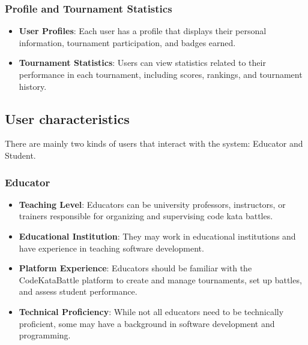 \subsubsection{Profile and Tournament Statistics}
\begin{itemize}
    \item \textbf{User Profiles}: Each user has a profile that displays their personal information, tournament participation, and badges earned.
    \item \textbf{Tournament Statistics}: Users can view statistics related to their performance in each tournament, including scores, rankings, and tournament history.
\end{itemize}

\subsection{User characteristics}
There are mainly two kinds of users that interact with the system: Educator and Student.
\subsubsection{Educator}
\begin{itemize}
    \item \textbf{Teaching Level}: Educators can be university professors, instructors, or trainers responsible for organizing and supervising code kata battles.
    \item \textbf{Educational Institution}: They may work in educational institutions and have experience in teaching software development.
    \item \textbf{Platform Experience}: Educators should be familiar with the CodeKataBattle platform to create and manage tournaments, set up battles, and assess student performance.
    \item \textbf{Technical Proficiency}: While not all educators need to be technically proficient, some may have a background in software development and programming.
\end{itemize}
